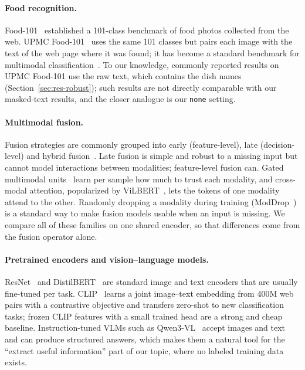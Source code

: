 \documentclass[11pt,a4paper]{article}
\begin{document}
\paragraph{Food recognition.}
Food-101~\cite{bossard2014food} established a 101-class benchmark of food photos collected from the web.
UPMC Food-101~\cite{wang2015recipe} uses the same 101 classes but pairs each image with the text of the web page
where it was found; it has become a standard benchmark for multimodal classification~\cite{kiela2018efficient}.
To our knowledge, commonly reported results on UPMC Food-101 use the raw text, which contains the dish names
(Section~\ref{sec:res-robust}); such results are not directly comparable with our masked-text results, and the
closer analogue is our \texttt{none} setting.

\paragraph{Multimodal fusion.}
Fusion strategies are commonly grouped into early (feature-level), late (decision-level) and hybrid
fusion~\cite{baltrusaitis2019multimodal}. Late fusion is simple and robust to a missing input but cannot model
interactions between modalities; feature-level fusion can. Gated multimodal units~\cite{arevalo2017gated} learn
per sample how much to trust each modality, and cross-modal attention, popularized by ViLBERT~\cite{lu2019vilbert},
lets the tokens of one modality attend to the other. Randomly dropping a modality during training
(ModDrop~\cite{neverova2016moddrop}) is a standard way to make fusion models usable when an input is missing. We
compare all of these families on one shared encoder, so that differences come from the fusion operator alone.

\paragraph{Pretrained encoders and vision--language models.}
ResNet~\cite{he2016deep} and DistilBERT~\cite{sanh2019distilbert} are standard image and text encoders that are
usually fine-tuned per task. CLIP~\cite{radford2021clip} learns a joint image--text embedding from 400M web pairs
with a contrastive objective and transfers zero-shot to new classification tasks; frozen CLIP features with a small
trained head are a strong and cheap baseline. Instruction-tuned VLMs such as Qwen3-VL~\cite{qwen3vl} accept images
and text and can produce structured answers, which makes them a natural tool for the ``extract useful
information'' part of our topic, where no labeled training data exists.
\end{document}
